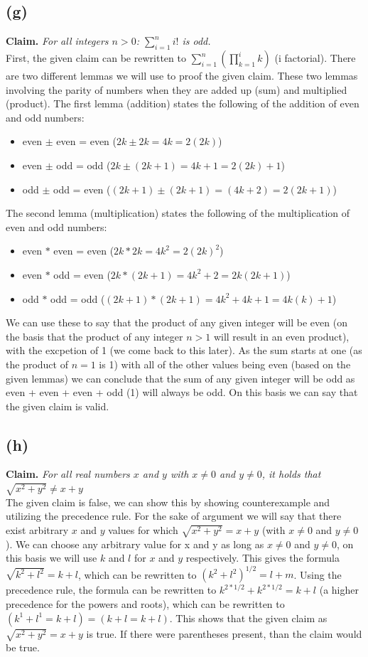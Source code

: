 \documentclass[a4paper]{article}
\begin{document}
\subsection{(g)} 
\textbf{Claim.} \textit{For all integers $n > 0$: $\sum_{i=1}^{n} i!$ is odd.}\\
First, the given claim can be rewritten to $\sum_{i=1}^{n} (\prod_{k=1}^{i}k)$ (i factorial).
There are two different lemmas we will use to proof the given claim.
These two lemmas involving the parity of numbers when they are added up (sum) and multiplied (product).
The first lemma (addition) states the following of the addition of even and odd numbers:
\begin{itemize}
    \item even $\pm$ even = even ($2k \pm 2k = 4k = 2(2k)$)
    \item even $\pm$ odd = odd ($2k \pm (2k+1) = 4k + 1 = 2(2k) + 1$)
    \item odd $\pm$ odd = even ($(2k + 1) \pm (2k + 1) = (4k + 2) = 2(2k+1)$)
\end{itemize}
The second lemma (multiplication) states the following of the multiplication of even and odd numbers:
\begin{itemize}
    \item even $\ast$ even = even ($2k \ast 2k = 4k^2 = 2(2k)^2$)
    \item even $\ast$ odd = even ($2k \ast (2k + 1 ) = 4k^2 + 2 = 2k(2k+1) $)
    \item odd $\ast$ odd = odd ($(2k+1) \ast (2k+1) = 4k^2 + 4k + 1 = 4k(k) + 1$)
\end{itemize}
We can use these to say that the product of any given integer will be even (on the basis that the product of any integer $n > 1$ will result in an even product), with the excpetion of 1 (we come back to this later).
As the sum starts at one (as the product of $n = 1$ is 1) with all of the other values being even (based on the given lemmas) we can conclude that the sum of any given integer will be odd as even + even + even + odd (1) will always be odd.
On this basis we can say that the given claim is valid.
\subsection{(h)} 
\textbf{Claim.} \textit{For all real numbers $x$ and $y$ with $x \neq 0$ and $y \neq 0$, it holds that $\sqrt{x^2 + y^2} \neq x + y$} \\
The given claim is false, we can show this by showing counterexample and utilizing the precedence rule.
For the sake of argument we will say that there exist arbitrary $x$ and $y$ values for which $\sqrt{x^2 + y^2} = x + y$ (with $x \neq 0$ and $y \neq 0$).
We can choose any arbitrary value for x and y as long as $x \neq 0$ and $y \neq 0$, on this basis we will use $k$ and $l$ for $x$ and $y$ respectively.
This gives the formula $\sqrt{k^2 + l^2} = k + l$, which can be rewritten to $(k^2 + l^2)^{1/2} = l + m$.
Using the precedence rule, the formula can be rewritten to $k^{2 * 1/2} + k^{2 * 1/2} = k +l$ (a higher precedence for the powers and roots), which can be rewritten to $(k^1 + l^1 = k + l) = (k + l = k + l)$.
This shows that the given claim as $\sqrt{x^2 + y^2} = x + y$ is true. 
If there were parentheses present, than the claim would be true.
\end{document}
